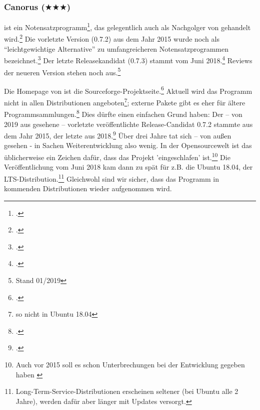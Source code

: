 %
%
%



\subsubsection{Canorus ($\bigstar$$\bigstar$$\bigstar$)}

\label{Canorus} ist ein Notensatzprogramm\footcite[vgl.][\nopage
wp]{Canorus2019a}, das gelegentlich auch als Nachgolger von 
gehandelt wird.\footcite[vgl.][\nopage wp]{WpedCanorus2019a} Die vorletzte
Version (0.7.2) aus dem Jahr 2015 wurde noch als \enquote{leichtgewichtige
Alternative} zu umfangreicheren Notensatzprogrammen
bezeichnet.\footcite[vgl.][\nopage wp]{Kreussel2015a} Der letzte Releasekandidat
(0.7.3) stammt vom Juni 2018.\footcite[vgl.][\nopage wp]{Canorus2019b} Reviews
der neueren Version stehen noch aus.\footnote{Stand 01/2019}

Die Homepage von  ist die
Sourceforge-Projektseite.\footcite[vgl.][\nopage wp]{Canorus2019a} Aktuell wird
das Programm nicht in allen Distributionen angeboten\footnote{so nicht in Ubuntu
18.04}; externe Pakete gibt es eher für ältere
Programmsammlungen.\footcite[vgl.][\nopage wp]{RepoCanorus2019a} Dies dürfte
einen einfachen Grund haben: Der -- von 2019 aus gesehene -- vorletzte
veröffentlichte Release-Candidat 0.7.2 stammte aus dem Jahr 2015, der letzte aus
2018.\footcite[vgl.][\nopage wp]{Canorus2019b} Über drei Jahre tat sich -- von
außen gesehen - in Sachen Weiterentwicklung also wenig. In der Opensourcewelt
ist das üblicherweise ein Zeichen dafür, dass das Projekt 'eingeschlafen'
ist.\footnote{Auch vor 2015 soll es schon Unterbrechungen bei der Entwicklung
gegeben haben \cite[vgl.][\nopage wp]{UbuntuCanorus2014a}} Die Veröffentlichung
vom Juni 2018 kam dann zu spät für z.B. die Ubuntu 18.04, der
LTS-Distribution.\footnote{Long-Term-Service-Distributionen erscheinen seltener
(bei Ubuntu alle 2 Jahre), werden dafür aber länger mit Updates versorgt.}
Gleichwohl sind wir sicher, dass das Programm in kommenden Distributionen wieder
aufgenommen wird.

